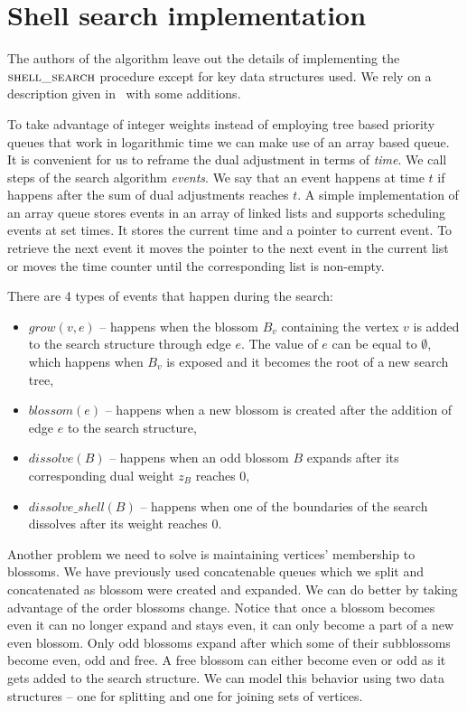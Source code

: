 \section{Shell search implementation}

The authors of the algorithm leave out the details of implementing the $\textsc{shell\_search}$ procedure except for key data structures used. We rely on a description given in~\cite{duan2018scaling} with some additions.

To take advantage of integer weights instead of employing tree based priority queues that work in logarithmic time we can make use of an array based queue. It is convenient for us to reframe the dual adjustment in terms of \textit{time}. We call steps of the search algorithm \textit{events}. We say that an event happens at time $t$ if happens after the sum of dual adjustments reaches $t$. A simple implementation of an array queue stores events in an array of linked lists and supports scheduling events at set times. It stores the current time and a pointer to current event. To retrieve the next event it moves the pointer to the next event in the current list or moves the time counter until the corresponding list is non-empty.

There are 4 types of events that happen during the search:

\begin{itemize}
    \item $grow(v, e)$ – happens when the blossom $B_v$ containing the vertex $v$ is added to the search structure through edge $e$. The value of $e$ can be equal to $\emptyset$, which happens when $B_v$ is exposed and it becomes the root of a new search tree,
    \item $blossom(e)$ – happens when a new blossom is created after the addition of edge $e$ to the search structure,
    \item $dissolve(B)$ – happens when an odd blossom $B$ expands after its corresponding dual weight $z_B$ reaches $0$,
    \item $dissolve\_shell(B)$ – happens when one of the boundaries of the search dissolves after its weight reaches $0$. 
\end{itemize}

Another problem we need to solve is maintaining vertices' membership to blossoms. We have previously used concatenable queues which we split and concatenated as blossom were created and expanded. We can do better by taking advantage of the order blossoms change. Notice that once a blossom becomes even it can no longer expand and stays even, it can only become a part of a new even blossom. Only odd blossoms expand after which some of their subblossoms become even, odd and free. A free blossom can either become even or odd as it gets added to the search structure. We can model this behavior using two data structures – one for splitting and one for joining sets of vertices.

